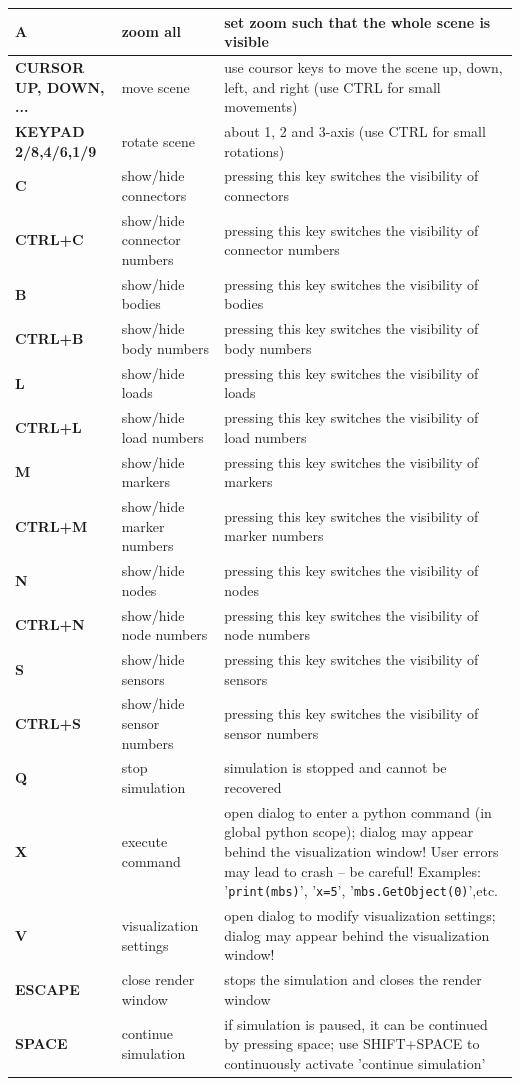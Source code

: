 \documentclass[11pt,a4paper]{book} %
\begin{document}
\begin{center}
\begin{longtable}{| p{4cm} | p{4cm} | p{8cm} |}
  \bf A & zoom all & set zoom such that the whole scene is visible \\ \hline
  \bf CURSOR UP, DOWN, ... & move scene& use coursor keys to move the scene up, down, left, and right (use CTRL for small movements)\\ \hline
  \bf KEYPAD 2/8,4/6,1/9 & rotate scene & about 1, 2 and 3-axis (use CTRL for small rotations) \\ \hline
  \bf C & show/hide connectors & pressing this key switches the visibility of connectors \\ \hline
  \bf CTRL+C & show/hide connector numbers & pressing this key switches the visibility of connector numbers \\ \hline
	\bf B & show/hide bodies & pressing this key switches the visibility of bodies \\ \hline
  \bf CTRL+B & show/hide body numbers & pressing this key switches the visibility of body numbers \\ \hline
	\bf L & show/hide loads & pressing this key switches the visibility of loads \\ \hline
  \bf CTRL+L & show/hide load numbers & pressing this key switches the visibility of load numbers \\ \hline
	\bf M & show/hide markers & pressing this key switches the visibility of markers \\ \hline
  \bf CTRL+M & show/hide marker numbers & pressing this key switches the visibility of marker numbers \\ \hline
	\bf N & show/hide nodes & pressing this key switches the visibility of nodes \\ \hline
  \bf CTRL+N & show/hide node numbers & pressing this key switches the visibility of node numbers \\ \hline
	\bf S & show/hide sensors & pressing this key switches the visibility of sensors \\ \hline
  \bf CTRL+S & show/hide sensor numbers & pressing this key switches the visibility of sensor numbers \\ \hline
	\bf Q & stop simulation & simulation is stopped and cannot be recovered \\ \hline
	\bf X & execute command & open dialog to enter a python command (in global python scope); dialog may appear behind the visualization window! User errors may lead to crash -- be careful! 
	Examples: '\texttt{print(mbs)}', '\texttt{x=5}', '\texttt{mbs.GetObject(0)}',etc.\\ \hline
	\bf V & visualization settings & open dialog to modify visualization settings; dialog may appear behind the visualization window! \\ \hline
  \bf ESCAPE & close render window & stops the simulation and closes the render window \\ \hline
  \bf SPACE & continue simulation & if simulation is paused, it can be continued by pressing space; use SHIFT+SPACE to continuously activate 'continue simulation'\\ \hline
  \end{longtable}
\end{center}
\end{document}

